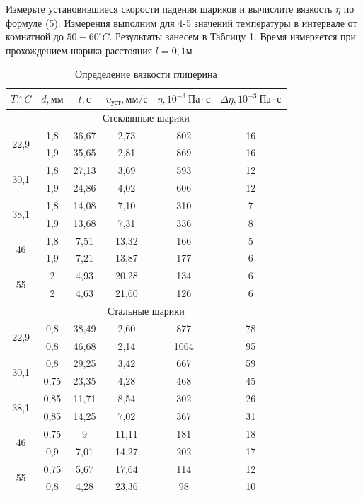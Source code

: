 \documentclass[a4paper,12pt]{article}
\theoremstyle{plain} %
\theoremstyle{definition} %
\theoremstyle{remark} %
\begin{document}
Измерьте установившиеся скорости падения шариков и вычислите вязкость $\eta$ по формуле (5). Измерения выполним для 4-5 значений температуры в интервале от комнатной до $50-60^\circ C$. Результаты занесем в Таблицу 1. Время измеряется при прохождением шарика расстояния $l = 0,1 \text{м}$
\begin{table}[!h]
	\begin{center}
	\begin{tabular}{|c|c|c|c|c|c|}
		\hline
		$T, ^\circ\! C$  & $d, \text{мм}$    & $t, \text{с}$   & $\upsilon_{\text{уст}}, \text{мм}/\text{с}$    & $\eta, 10^{-3} \ \text{Па}\cdot \text{с}$   & $\Delta\eta, 10^{-3} \ \text{Па}\cdot \text{с}$\\ \hline
		\multicolumn{6}{|c|}{Стеклянные шарики}    \\ \hline
		\multirow{2}{*}{22,9} & 1,8  & 36,67 & 2,73  & 802  & 16 \\ \cline{2-6}
		& 1,9  & 35,65 & 2,81  & 869  & 16 \\ \hline
		\multirow{2}{*}{30,1} & 1,8  & 27,13 & 3,69  & 593  & 12 \\ \cline{2-6}
		& 1,9  & 24,86 & 4,02  & 606  & 12 \\ \hline
		\multirow{2}{*}{38,1} & 1,8  & 14,08 & 7,10  & 310  & 7  \\  \cline{2-6}
		& 1,9  & 13,68 & 7,31  & 336  & 8  \\ \hline
		\multirow{2}{*}{46}   & 1,8  & 7,51  & 13,32 & 166  & 5  \\  \cline{2-6}
		& 1,9  & 7,21  & 13,87 & 177  & 6  \\ \hline
		\multirow{2}{*}{55}   & 2    & 4,93  & 20,28 & 134  & 6  \\  \cline{2-6}
		& 2    & 4,63  & 21,60 & 126  & 6  \\ \hline
		\multicolumn{6}{|c|}{Стальные шарики}    \\ \hline
		\multirow{2}{*}{22,9} & 0,8  & 38,49 & 2,60  & 877  & 78 \\  \cline{2-6}
		& 0,8  & 46,68 & 2,14  & 1064 & 95 \\ \hline
		\multirow{2}{*}{30,1}& 0,8  & 29,25 & 3,42  & 667  & 59 \\  \cline{2-6}
		& 0,75 & 23,35 & 4,28  & 468  & 45 \\ \hline
		\multirow{2}{*}{38,1} & 0,85 & 11,71 & 8,54  & 302  & 26 \\  \cline{2-6}
		& 0,85 & 14,25 & 7,02  & 367  & 31 \\ \hline
		\multirow{2}{*}{46}   & 0,75 & 9     & 11,11 & 181  & 18 \\  \cline{2-6}
		& 0,9  & 7,01  & 14,27 & 202  & 17 \\ \hline
		\multirow{2}{*}{55}   & 0,75 & 5,67  & 17,64 & 114  & 12 \\  \cline{2-6}
		& 0,8  & 4,28  & 23,36 & 98   & 10 \\ \hline
	\end{tabular}
\end{center}
\caption{Определение вязкости глицерина}
\end{table}
\end{document}
